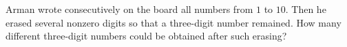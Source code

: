 Arman wrote consecutively on the board all numbers from $1$ to $10$. Then he erased several nonzero digits so that a three-digit number remained. How many different three-digit numbers could be obtained after such erasing?

